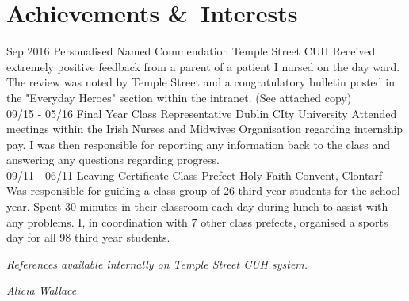 \documentclass[]{friggeri-cv}
\begin{document}
\section{Achievements \&\ Interests}
\begin{entrylist}
  \entry
    {Sep 2016}
    {Personalised Named Commendation}
    {Temple Street CUH}
    {Received extremely positive feedback from a parent of a patient I nursed on the day ward. The review was noted by Temple Street and a congratulatory bulletin posted in the "Everyday Heroes" section within the intranet. (See attached copy)\\}
  \entry
    {09/15 - 05/16}
    {Final Year Class Representative}
    {Dublin CIty University}
    {Attended meetings within the Irish Nurses and Midwives Organisation regarding
internship pay. I was then responsible for reporting any information back to the class
and answering any questions regarding progress.
\\}
  \entry
    {09/11 - 06/11}
    {Leaving Certificate Class Prefect}
    {Holy Faith Convent, Clontarf}
    {Was responsible for guiding a class group of 26 third year students for the school year.
Spent 30 minutes in their classroom each day during lunch to assist with any problems.
I, in coordination with 7 other class prefects, organised a sports day for all 98 third
year students.\\}
\end{entrylist}




\begin{flushleft}
\emph{References available internally on Temple Street CUH system.}
\end{flushleft}
\begin{flushright}
\emph{Alicia Wallace}
\end{flushright}
\end{document}
